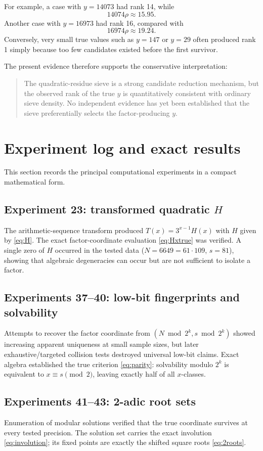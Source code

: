 \documentclass[11pt,a4paper]{article}
\begin{document}
For example, a case with \(y=14073\) had rank 14, while
\[
14074\rho\approx15.95.
\]
Another case with \(y=16973\) had rank 16, compared with
\[
16974\rho\approx19.24.
\]
Conversely, very small true values such as \(y=147\) or \(y=29\) often produced rank 1 simply because too few candidates existed before the first survivor.

The present evidence therefore supports the conservative interpretation:
\begin{quote}
The quadratic-residue sieve is a strong candidate reduction mechanism, but the observed rank of the true \(y\) is quantitatively consistent with ordinary sieve density. No independent evidence has yet been established that the sieve preferentially selects the factor-producing \(y\).
\end{quote}

\section{Experiment log and exact results}
\label{sec:experiments}

This section records the principal computational experiments in a compact mathematical form.

\subsection*{Experiment 23: transformed quadratic \(H\)}
The arithmetic-sequence transform produced \(T(x)=3^{x-1}H(x)\) with \(H\) given by \eqref{eq:H}. The exact factor-coordinate evaluation \eqref{eq:Hxtrue} was verified. A single zero of \(H\) occurred in the tested data (\(N=6649=61\cdot109\), \(s=81\)), showing that algebraic degeneracies can occur but are not sufficient to isolate a factor.

\subsection*{Experiments 37--40: low-bit fingerprints and solvability}
Attempts to recover the factor coordinate from \((N\bmod2^k,s\bmod2^k)\) showed increasing apparent uniqueness at small sample sizes, but later exhaustive/targeted collision tests destroyed universal low-bit claims. Exact algebra established the true criterion \eqref{eq:parity}: solvability modulo \(2^k\) is equivalent to \(x\equiv s\pmod2\), leaving exactly half of all \(x\)-classes.

\subsection*{Experiments 41--43: 2-adic root sets}
Enumeration of modular solutions verified that the true coordinate survives at every tested precision. The solution set carries the exact involution \eqref{eq:involution}; its fixed points are exactly the shifted square roots \eqref{eq:2roots}.
\end{document}
